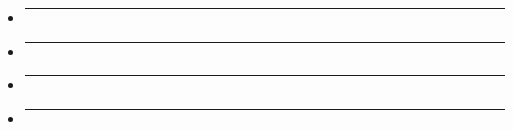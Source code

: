 \subsubsection{}\label{section-11}

\begin{itemize}
\item
  \begin{center}\rule{0.5\linewidth}{0.5pt}\end{center}
\item
  \begin{center}\rule{0.5\linewidth}{0.5pt}\end{center}
\item
  \begin{center}\rule{0.5\linewidth}{0.5pt}\end{center}
\item
  \begin{center}\rule{0.5\linewidth}{0.5pt}\end{center}
\end{itemize}

